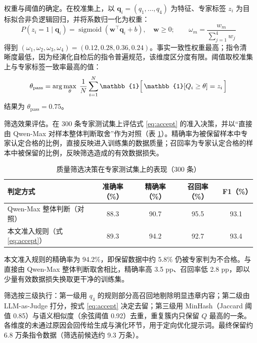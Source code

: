\documentclass[fontset=fandol,type=master,campus=shenzhen,etitleauto=true]{hithesisbook}
\begin{document}
权重与阈值的确定。在校准集上，以 $\mathbf{q}_i = (q_1, \ldots, q_4)$ 为特征、专家标签 $z_i$ 为目标拟合非负逻辑回归，并将系数归一化为权重：
\begin{equation}\label{eq:weight-calib}
P(z_i = 1 \mid \mathbf{q}_i) = \operatorname{sigmoid}(\mathbf{w}^\top \mathbf{q}_i + b), \quad \mathbf{w} \ge 0; \qquad
\omega_m = \frac{w_m}{\sum_{j=1}^{4} w_j}
\end{equation}
得到 $(\omega_1, \omega_2, \omega_3, \omega_4) = (0.12, 0.28, 0.36, 0.24)$。事实一致性权重最高；指令清晰度最低，因为经演化自检后的指令普遍规范，该维度区分度有限。阈值取校准集上与专家标签一致率最高的值：
\begin{equation}\label{eq:theta-pass}
\theta_{\text{pass}} = \arg\max_{\theta} \; \frac{1}{N} \sum_{i=1}^{N} \mathbb{1}\Bigl[\, \mathbb{1}[Q_i \ge \theta] = z_i \,\Bigr]
\end{equation}
结果为 $\theta_{\text{pass}} = 0.75$。

筛选效果评估。在 300 条专家测试集上评估式 \eqref{eq:accept} 的准入决策，并以“直接由 Qwen-Max 对样本整体判断取舍”作为对照（表 \ref{tab:quality-gold}）。精确率为被保留样本中专家认定合格的比例，直接反映进入训练集的数据质量；召回率为专家认定合格的样本中被保留的比例，反映筛选造成的有效数据损失。

\begin{table}[htbp]
\centering
\caption{质量筛选决策在专家测试集上的表现（300 条）}
\label{tab:quality-gold}
\small
\renewcommand{\arraystretch}{1.15}
\begin{tabular}{l c c c c}
\toprule
\textbf{判定方式} & \textbf{准确率（\%）} & \textbf{精确率（\%）} & \textbf{召回率（\%）} & \textbf{F1（\%）} \\
\midrule
Qwen-Max 整体判断（对照） & 88.3 & 90.7 & 95.5 & 93.1 \\
本文准入规则（式 \eqref{eq:accept}） & 89.3 & 94.2 & 92.7 & 93.4 \\
\bottomrule
\end{tabular}
\end{table}

本文准入规则的精确率为 94.2\%，即保留数据中约 5.8\% 仍被专家判为不合格。与直接由 Qwen-Max 整体判断取舍相比，精确率高 3.5 pp、召回率低 2.8 pp，即以少量有效数据损失换取更干净的训练集。

筛选按三级执行：第一级用 $q_4$ 的规则部分高召回地剔除明显违章内容；第二级由 LLM-as-Judge\cite{ref65} 打分，按式 \eqref{eq:accept} 决定去留；第三级用 MinHash（Jaccard 阈值 0.85）与语义相似度（余弦阈值 0.92）去重，重复簇内只保留 $Q$ 最高的一条。各维度的未通过原因会回传给生成与演化环节，用于定向优化提示词。最终保留约 6.8 万条指令数据（筛选前候选约 9.3 万条）。
\end{document}
